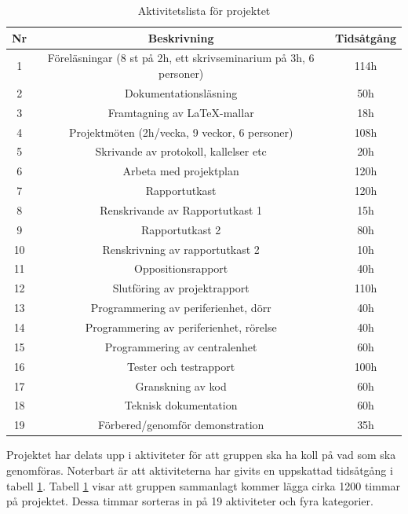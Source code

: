 \documentclass[a4paper]{article}
\begin{document}
\begin{table}[H]
    \begin{center}
        \begin{tabular}{ |c|c|c| }\hline
            Nr & Beskrivning & Tidsåtgång \\\hline\hline
            1 & Föreläsningar (8 st på 2h, ett skrivseminarium på 3h, 6 personer) & 114h \\\hline
            2 & Dokumentationsläsning & 50h \\\hline
            3 & Framtagning av LaTeX-mallar & 18h \\\hline
            4 & Projektmöten (2h/vecka, 9 veckor, 6 personer) & 108h \\\hline
            5 & Skrivande av protokoll, kallelser etc & 20h \\\hline
            6 & Arbeta med projektplan & 120h \\\hline
            7 & Rapportutkast & 120h \\\hline
            8 & Renskrivande av Rapportutkast 1 & 15h \\\hline
            9 & Rapportutkast 2 & 80h\\\hline
            10 & Renskrivning av rapportutkast 2 & 10h \\\hline
            11 & Oppositionsrapport & 40h\\\hline
            12 & Slutföring av projektrapport & 110h\\\hline
            13 & Programmering av periferienhet, dörr & 40h \\\hline
            14 & Programmering av periferienhet, rörelse & 40h \\\hline
            15 & Programmering av centralenhet & 60h \\\hline
            16 & Tester och testrapport & 100h\\\hline
            17 & Granskning av kod & 60h \\\hline
            18 & Teknisk dokumentation & 60h \\\hline
            19 & Förbered/genomför demonstration & 35h \\\hline
        \end{tabular}
        \caption{Aktivitetslista för projektet}
        \label{table:aktivitetslista}
    \end{center}
\end{table}

Projektet har delats upp i aktiviteter för att gruppen ska ha koll på vad som ska genomföras. Noterbart är att aktiviteterna har givits en uppskattad tidsåtgång i tabell \ref{table:aktivitetslista}. Tabell \ref{table:aktivitetslista} visar att gruppen sammanlagt kommer lägga cirka 1200 timmar på projektet. Dessa timmar sorteras in på 19 aktiviteter och fyra kategorier.
\end{document}
